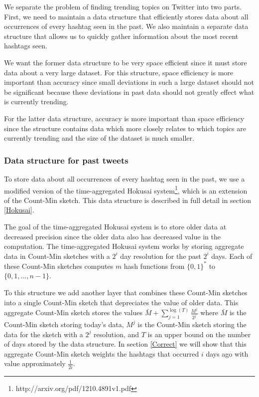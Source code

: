 \documentclass[a4paper,12pt]{article}
\begin{document}
We separate the problem of finding trending topics on Twitter into two parts.  First, we need to maintain a data structure that efficiently stores data about all occurrences of every hashtag seen in the past.  We also maintain a separate data structure that allows us to quickly gather information about the most recent hashtags seen.

We want the former data structure to be very space efficient since it must store data about a very large dataset.  For this structure, space efficiency is more important than accuracy since small deviations in such a large dataset should not be significant because these deviations in past data should not greatly effect what is currently trending.

For the latter data structure, accuracy is more important than space efficiency since the structure contains data which more closely relates to which topics are currently trending and the size of the dataset is much smaller.

\subsubsection{Data structure for past tweets}

To store data about all occurrences of every hashtag seen in the past, we use a modified version of the time-aggregated Hokusai system\footnote{http://arxiv.org/pdf/1210.4891v1.pdf}, which is an extension of the Count-Min sketch.  This data structure is described in full detail in section \ref{Hokusai}.

The goal of the time-aggregated Hokusai system is to store older data at decreased precision since the older data also has decreased value in the computation.  The time-aggregated Hokusai system works by storing aggregate data in Count-Min sketches with a $2^i$ day resolution for the past $2^i$ days.  Each of these Count-Min sketches computes $m$ hash functions from $\{0,1\}^*$ to $\{0, 1, …, n-1\}$.

To this structure we add another layer that combines these Count-Min sketches into a single Count-Min sketch that depreciates the value of older data.  This aggregate Count-Min sketch stores the values $\bar{M} + \sum\limits_{j=1}^{\log⁡(T)} \frac{M^j}{2^j}$ where $\bar{M}$ is the Count-Min sketch storing today's data, $M^j$ is the Count-Min sketch storing the data for the sketch with a $2^j$ resolution, and $T$ is an upper bound on the number of days stored by the data structure.  In section \ref{Correct} we will show that this aggregate Count-Min sketch weights the hashtags that occurred $i$ days ago with value approximately $\frac{1}{2i}$.
\end{document}
